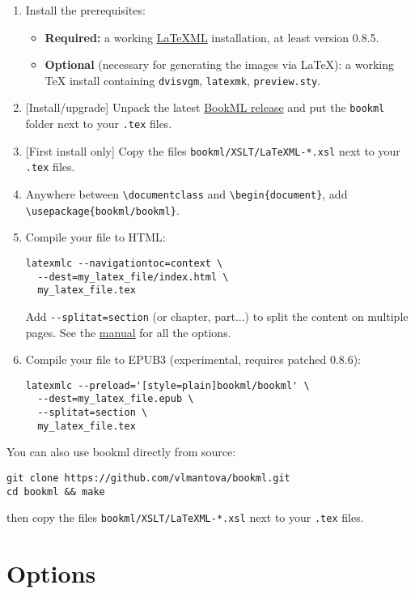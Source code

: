\documentclass[a4paper,british]{article}
\def\ltxinline{\lstinline[style=bookml]}
\begin{document}
\begin{enumerate}
  \item Install the prerequisites:
  \begin{itemize}
    \item \textbf{Required:} a working \href{https://dlmf.nist.gov/LaTeXML/}{LaTeXML} installation, at least version 0.8.5.
    \item \textbf{Optional} (necessary for generating the images via \LaTeX): a working \TeX{} install containing \lstinline|dvisvgm|, \lstinline|latexmk|, \lstinline|preview.sty|.
  \end{itemize}
  \item {}[Install/upgrade] Unpack the latest \href{https://github.com/vlmantova/bookml/releases}{BookML release} and put the \lstinline|bookml| folder next to your \lstinline|.tex| files.
  \item {}[First install only] Copy the files \lstinline|bookml/XSLT/LaTeXML-*.xsl| next to your \lstinline|.tex| files.
  \item Anywhere between \ltxinline|\documentclass| and \ltxinline|\begin{document}|, add \ltxinline|\usepackage{bookml/bookml}|.
  \item Compile your file to HTML:
    \begin{lstlisting}
latexmlc --navigationtoc=context \
  --dest=my_latex_file/index.html \
  my_latex_file.tex
    \end{lstlisting}
    Add \ltxinline|--splitat=section| (or chapter, part...) to split the content on multiple pages. See the \LaTeXML{} \href{https://dlmf.nist.gov/LaTeXML/manual/usage/}{manual} for all the options.
  \item Compile your file to EPUB3 (experimental, requires patched \LaTeXML{} 0.8.6):
    \begin{lstlisting}
latexmlc --preload='[style=plain]bookml/bookml' \
  --dest=my_latex_file.epub \
  --splitat=section \
  my_latex_file.tex
    \end{lstlisting}
\end{enumerate}

You can also use bookml directly from source:
\begin{lstlisting}
git clone https://github.com/vlmantova/bookml.git
cd bookml && make
\end{lstlisting}
then copy the files \lstinline|bookml/XSLT/LaTeXML-*.xsl| next to your \lstinline|.tex| files.

\section{Options}
\end{document}
